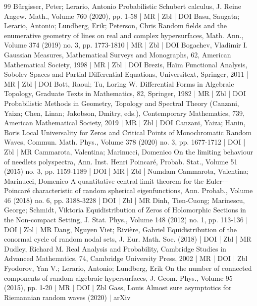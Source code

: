 \begin{thebibliography}{99}
Bürgisser, Peter; Lerario, Antonio Probabilistic Schubert calculus, J. Reine Angew. Math., Volume 760 (2020), pp. 1-58 | MR | Zbl | DOI
Basu, Saugata; Lerario, Antonio; Lundberg, Erik; Peterson, Chris Random fields and the enumerative geometry of lines on real and complex hypersurfaces, Math. Ann., Volume 374 (2019) no. 3, pp. 1773-1810 | MR | Zbl | DOI
Bogachev, Vladimir I. Gaussian Measures, Mathematical Surveys and Monographs, 62, American Mathematical Society, 1998 | MR | Zbl | DOI
Brezis, Haïm Functional Analysis, Sobolev Spaces and Partial Differential Equations, Universitext, Springer, 2011 | MR | Zbl | DOI
Bott, Raoul; Tu, Loring W. Differential Forms in Algebraic Topology, Graduate Texts in Mathematics, 82, Springer, 1982 | MR | Zbl | DOI
Probabilistic Methods in Geometry, Topology and Spectral Theory (Canzani, Yaiza; Chen, Linan; Jakobson, Dmitry, eds.), Contemporary Mathematics, 739, American Mathematical Society, 2019 | MR | Zbl | DOI
Canzani, Yaiza; Hanin, Boris Local Universality for Zeros and Critical Points of Monochromatic Random Waves, Commun. Math. Phys., Volume 378 (2020) no. 3, pp. 1677-1712 | DOI | Zbl | MR
Cammarota, Valentina; Marinucci, Domenico On the limiting behaviour of needlets polyspectra, Ann. Inst. Henri Poincaré, Probab. Stat., Volume 51 (2015) no. 3, pp. 1159-1189 | DOI | MR | Zbl | Numdam
Cammarota, Valentina; Marinucci, Domenico A quantitative central limit theorem for the Euler-–Poincaré characteristic of random spherical eigenfunctions, Ann. Probab., Volume 46 (2018) no. 6, pp. 3188-3228 | DOI | Zbl | MR
Dinh, Tien-Cuong; Marinescu, George; Schmidt, Viktoria Equidistribution of Zeros of Holomorphic Sections in the Non-compact Setting, J. Stat. Phys., Volume 148 (2012) no. 1, pp. 113-136 | DOI | Zbl | MR
Dang, Nguyen Viet; Rivière, Gabriel Equidistribution of the conormal cycle of random nodal sets, J. Eur. Math. Soc. (2018) | DOI | Zbl | MR
Dudley, Richard M. Real Analysis and Probability, Cambridge Studies in Advanced Mathematics, 74, Cambridge University Press, 2002 | MR | DOI | Zbl
Fyodorov, Yan V.; Lerario, Antonio; Lundberg, Erik On the number of connected components of random algebraic hypersurfaces, J. Geom. Phys., Volume 95 (2015), pp. 1-20 | MR | DOI | Zbl
Gass, Louis Almost sure asymptotics for Riemannian random waves (2020) | arXiv

\end{thebibliography}
